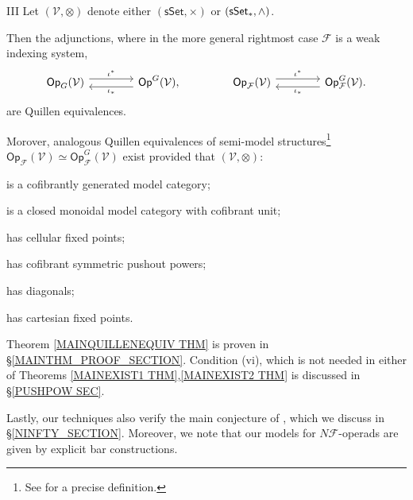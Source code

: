 \documentclass[a4paper,10pt]{article}%
\begin{document}
\begin{customthm}{III}\label{MAINQUILLENEQUIV THM}
Let $(\mathcal{V},\otimes)$
denote either 
$(\mathsf{sSet}, \times)$
or
$(\mathsf{sSet}_{\**}, \wedge)$.

Then the adjunctions, 
where in the more general rightmost case 
$\mathcal{F}$ is a weak indexing system,
\begin{equation}
\begin{tikzcd}[column sep =4em]
	\mathsf{Op}_G(\mathcal{V}) \ar[shift left=1.5]{r}{\iota^{\**}} 
	&
	\mathsf{Op}^G(\mathcal{V})
	\ar[shift left=1.5]{l}{\iota_{\**}},
&
	\mathsf{Op}_{\mathcal F}(\mathcal{V}) 
	\ar[shift left=1.5]{r}{\iota^{\**}} 
	&
	\mathsf{Op}^G_{\mathcal{F}}(\mathcal{V})
	\ar[shift left=1.5]{l}{\iota_{\**}}.
\end{tikzcd}
\end{equation}
are Quillen equivalences.

Morover, 
analogous Quillen equivalences of
semi-model structures\footnote{
See \cite[\S 12.1.8]{Fre09} for a precise definition.}
$\mathsf{Op}_{\mathcal F}(\mathcal{V}) \simeq
\mathsf{Op}^G_{\mathcal{F}}(\mathcal{V})$
exist
provided that
$(\mathcal{V},\otimes)$:
\begin{inparaenum}
\item[(i)] is a cofibrantly generated model category;
\item [(ii)] is a closed monoidal model category with cofibrant unit;
\item[(iii)] has cellular fixed points;
\item[(iv)] has cofibrant symmetric pushout powers;
\item[(v)] has diagonals;
\item[(vi)] has cartesian fixed points.
\end{inparaenum}
\end{customthm}

Theorem \ref{MAINQUILLENEQUIV THM}
is proven in 
\S \ref{MAINTHM_PROOF_SECTION}.
Condition (vi), which is not 
needed in either of
Theorems \ref{MAINEXIST1 THM},\ref{MAINEXIST2 THM}
is discussed in 
\S \ref{PUSHPOW SEC}.


Lastly, our techniques also verify 
the main conjecture of \cite{BH15},
which we discuss in \S \ref{NINFTY_SECTION}.
Moreover, we note that our models for
$N \mathcal{F}$-operads are given by explicit bar constructions.
\end{document}
